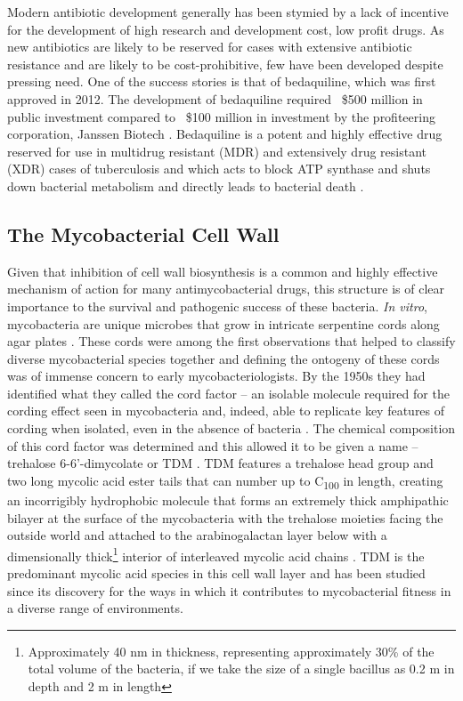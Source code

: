 Modern antibiotic development generally has been stymied by a lack of incentive for the development of high research and development cost, low profit drugs. As new antibiotics are likely to be reserved for cases with extensive antibiotic resistance and are likely to be cost-prohibitive, few have been developed despite pressing need. One of the success stories is that of bedaquiline, which was first approved in 2012. The development of bedaquiline required ~\$500 million in public investment compared to ~\$100 million in investment by the profiteering corporation, Janssen Biotech \citep{Gotham2020, Leibert2014, Osborne2013}. Bedaquiline is a potent and highly effective drug reserved for use in multidrug resistant (MDR) and extensively drug resistant (XDR) cases of tuberculosis and which acts to block ATP synthase and shuts down bacterial metabolism and directly leads to bacterial death \citep{Nguyen2018, Sarathy2019}. 

\subsection{The Mycobacterial Cell Wall}\label{cellwall}

Given that inhibition of cell wall biosynthesis is a common and highly effective mechanism of action for many antimycobacterial drugs, this structure is of clear importance to the survival and pathogenic success of these bacteria. \textit{In vitro}, mycobacteria are unique microbes that grow in intricate serpentine cords along agar plates \citep{Koch1882, Glickman2000}. These cords were among the first observations that helped to classify diverse mycobacterial species together and defining the ontogeny of these cords was of immense concern to early mycobacteriologists. By the 1950s they had identified what they called the cord factor -- an isolable molecule required for the cording effect seen in mycobacteria and, indeed, able to replicate key features of cording when isolated, even in the absence of bacteria \citep{Bloch1955, Bloch1953, Sorkin1952, Hunter2006a, Behling1993}. The chemical composition of this cord factor was determined and this allowed it to be given a name -- trehalose 6-6'-dimycolate or TDM \citep{Noll1956a}. TDM features a trehalose head group and two long mycolic acid ester tails that can number up to C\textsubscript{100} in length, creating an incorrigibly hydrophobic molecule that forms an extremely thick amphipathic bilayer at the surface of the mycobacteria with the trehalose moieties facing the outside world and attached to the arabinogalactan layer below with a dimensionally thick\footnote{Approximately 40 nm in thickness, representing approximately 30\% of the total volume of the bacteria, if we take the size of a single bacillus as 0.2 \textmu m in depth and 2 \textmu m in length} interior of interleaved mycolic acid chains \citep{Glickman2008, Welsh2013, BansalMutalik2014, Adhyapak2020}. TDM is the predominant mycolic acid species in this cell wall layer and has been studied since its discovery for the ways in which it contributes to mycobacterial fitness in a diverse range of environments.


